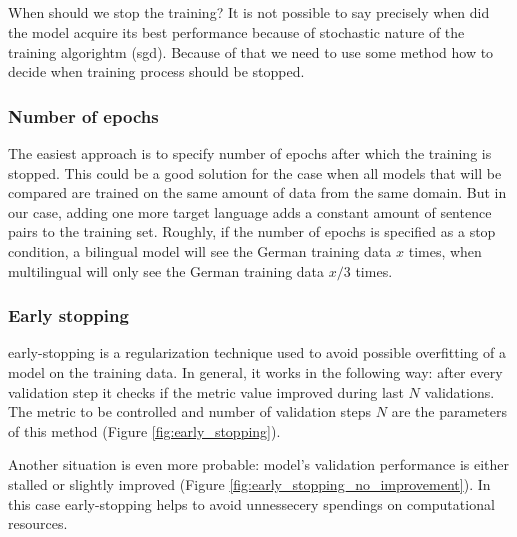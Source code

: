 \subsection{}
\label{section:finishing-the-training}

When should we stop the training?
It is not possible to say precisely when did the model
acquire its best performance because of stochastic nature of
the training algorightm (\acrshort{sgd}).
Because of that we need to use some method how to decide when
training process should be stopped.


\subsubsection*{Number of \glspl{epoch}}

The easiest approach is to specify number of \glspl{epoch}
after which the training is stopped.
This could be a good solution for the case when all models
that will be compared are trained on the same amount of data from
the same domain.
But in our case, adding one more target language adds a constant
amount of sentence pairs to the training set.
Roughly, if the number of \glspl{epoch} is specified as a stop
condition, a bilingual  model will see the German
training data $x$ times, when multilingual 
will only see the German training data $x / 3$ times.

\subsubsection*{Early stopping}

\Gls{early-stopping} is a regularization technique used to avoid
possible \gls{overfitting} of a model on the training data.
In general, it works in the following way: after every validation step
it checks if the metric value improved during last $N$ validations.
The metric to be controlled and number of validation steps $N$ are
the parameters of this method
(Figure \ref{fig:early_stopping}).

Another situation is even more probable: model's validation performance
is either stalled or slightly improved
(Figure \ref{fig:early_stopping_no_improvement}).
In this case \gls{early-stopping} helps to avoid unnessecery spendings
on computational resources.


